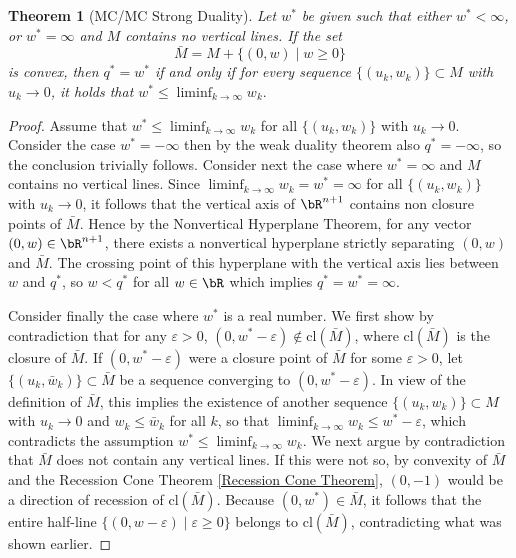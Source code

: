 \documentclass[11pt,a4paper,oneside,openany]{book}
\newtheorem{theorem}{Theorem}
\numberwithin{definition}{section}
\numberwithin{theorem}{section}
\numberwithin{problem}{section}
\begin{document}
\begin{theorem}[MC/MC Strong Duality] \label{strong duality theorem}
    Let $w^*$ be given such that either $w^* < \infty$, or $w^* = \infty$ and $M$ contains no vertical lines. If the set 
    \[
    \bar{M} = M + \{(0,w) \mid w \geq 0\}
    \] 
    is convex, then $q^* = w^*$ if and only if for every sequence \(\{(u_k,w_k)\} \subset M\) with $u_k \to 0$, it holds that 
    \(
    w^* \leq \liminf_{k \to \infty} w_k.
    \)
\end{theorem}
\begin{proof}
    Assume that $w^* \leq \liminf_{k \to \infty}w_k$ for all $\{(u_k,w_k)\}$ with $u_k \to 0$. Consider the case $w^* = -\infty$ then by the weak duality theorem also $q^* = -\infty$, so the conclusion trivially follows. Consider next the case where $w^* = \infty$ and $M$ contains no vertical lines. Since $\liminf_{k \to \infty}w_k = w^* = \infty$ for all  $\{(u_k,w_k)\}$ with $u_k \to 0$, it follows that the vertical axis of $\bR^{n+1}$ contains non closure points of $\bar M$. Hence by the Nonvertical Hyperplane Theorem, for any vector $(0,w) \in \bR^{n+1}$, there exists a nonvertical hyperplane strictly separating $(0,w)$ and $\bar M$. The crossing point of this hyperplane with the vertical axis lies between $w$ and $q^*$,  so $w < q^*$ for all $w \in \bR$ which implies $q^*=w^* = \infty$.

    
Consider finally the case where \(w^*\) is a real number. We first show by contradiction that for any \(\varepsilon > 0\), \((0, w^* - \varepsilon) \notin \mathrm{cl}(\bar{M})\), where \(\mathrm{cl}(\bar{M})\) is the closure of \(\bar{M}\). If \((0, w^* - \varepsilon)\) were a closure point of \(\bar{M}\) for some \(\varepsilon > 0\), let \(\{(u_k, \bar{w}_k)\} \subset \bar{M}\) be a sequence converging to \((0, w^* - \varepsilon)\). In view of the definition of \(\bar{M}\), this implies the existence of another sequence \(\{(u_k,w_k)\} \subset M\) with \(u_k \to 0\) and \(w_k \leq \bar{w}_k\) for all \(k\), so that \(\liminf_{k \to \infty} w_k \leq w^* - \varepsilon\), which contradicts the assumption \(w^* \leq \liminf_{k \to \infty} w_k\). We next argue by contradiction that \(\bar{M}\) does not contain any vertical lines. If this were not so, by convexity of \(\bar{M}\) and the Recession Cone Theorem \ref{Recession Cone Theorem}, \((0,-1)\) would be a direction of recession of \(\mathrm{cl}(\bar{M})\). Because \((0, w^*) \in \bar{M}\), it follows that the entire half-line \(\{(0, w - \varepsilon) \mid \varepsilon \geq 0\}\) belongs to \(\mathrm{cl}(\bar{M})\), contradicting what was shown earlier.



\end{proof}
\end{document}
